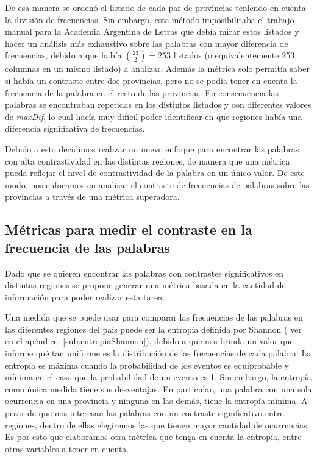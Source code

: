 De esa manera se ordenó el listado de cada par de provincias teniendo en cuenta la división de frecuencias. 
Sin embargo, este método imposibilitaba el trabajo manual para la Academia Argentina de Letras que debía mirar estos listados y hacer un análisis más exhaustivo sobre las palabras con mayor diferencia de frecuencias, debido a que había $\binom{23}{2} = 253$
listados (o equivalentemente 253 columnas en un mismo listado) a analizar. Además la métrica solo permitía saber si había un contraste entre dos provincias, pero no se podía tener en cuenta la frecuencia de la palabra en el resto de las provincias. 
En consecuencia las palabras se encontraban repetidas en los distintos listados y con diferentes valores de \textit{maxDif}, lo cual hacía muy difícil poder identificar en que regiones había una diferencia significativa de frecuencias.

Debido a esto decidimos realizar un nuevo enfoque para encontrar las palabras con alta contrastividad en las distintas regiones, de manera que una métrica pueda reflejar el nivel de contrastividad de la palabra en un único valor.
De este modo, nos enfocamos en analizar el contraste de frecuencias de palabras sobre las provincias a través de una métrica superadora.

\subsection{Métricas para medir el contraste en la frecuencia de las palabras}
Dado que se quieren encontrar las palabras con contrastes significativos en distintas 
regiones se propone generar una métrica basada en la cantidad de información 
para poder realizar esta tarea.

Una medida que se puede usar para comparar las frecuencias de las palabras en las diferentes regiones del país puede ser la entropía definida por Shannon ( ver en el apéndice: \ref{sub:entropiaShannon}), debido a que nos brinda un valor que informe qué tan uniforme es la distribución de las frecuencias de cada palabra. La entropía es máxima cuando la probabilidad de los eventos es equiprobable y mínima en el caso que la probabilidad de un evento es 1.
Sin embargo, la entropía como única medida tiene sus desventajas. En particular, una palabra con una sola ocurrencia en una provincia y ninguna en las demás, tiene la entropía mínima. A pesar de que nos interesan las palabras con un contraste significativo entre regiones, dentro de ellas elegiremos las que tienen mayor cantidad de ocurrencias. Es por esto que elaboramos otra métrica que tenga en cuenta la entropía, entre otras variables a tener en cuenta.


